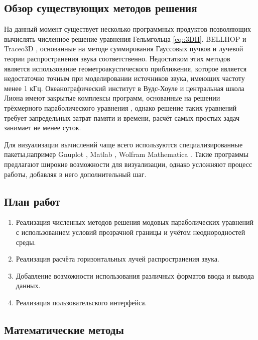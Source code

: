 \documentclass[../document.tex]{subfiles}
\begin{document}
    \subsection{Обзор существующих методов решения}
        \par На данный момент существует несколько программных продуктов позволяющих вычислять численное решение уравнения Гельмгольца \eqref{eq::3DH}. BELLHOP \cite{bellhop} и Traceo3D \cite{traceo}, основанные на методе суммирования Гауссовых пучков и лучевой теории распространения звука соответственно. Недостатком этих методов является использование геометроакустического приближения, которое является недостаточно точным при моделировании источников звука, имеющих частоту менее 1 кГц. Океанографический институт в Вудс-Хоуле \cite{whoi} и центральная школа Лиона \cite{lyon} имеют закрытые комплексы программ, основанные на решении трёхмерного параболического уравнения \cite{isakson14,lin12,shtrum16}, однако решение таких уравнений требует запредельных затрат памяти и времени, расчёт самых простых задач занимает не менее суток.
        \par Для визуализации вычислений чаще всего используются специализированные пакеты,например Gnuplot \cite{gnuplot}, Matlab \cite{matlab}, Wolfram Mathematica \cite{wolfram}. Такие программы предлагают широкие возможности для визуализации, однако усложняют процесс работы, добавляя в него дополнительный шаг.
    \subsection{План работ}
        \begin{enumerate}
            \item Реализация численных методов решения модовых параболических уравнений с использованием условий прозрачной границы и учётом неоднородностей среды.
            \item Реализация расчёта горизонтальных лучей распространения звука.
            \item Добавление возможности использования различных форматов ввода и вывода данных.
            \item Реализация пользовательского интерфейса.
        \end{enumerate}
    \subsection{Математические методы}
\end{document}
